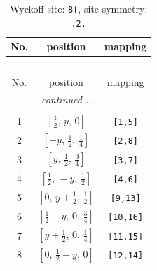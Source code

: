 \documentclass[fleqn,8pt]{jsarticle}
\begin{document}
\begin{longtable}{ccc}
\caption{Wyckoff site: {\tt 8f}, site symmetry: {\tt .2.}}
 \\
 \hline \hline
No. & position & mapping \\ \hline \endfirsthead

\multicolumn{2}{l}{\tablename\ \thetable{}} \\
 \hline \hline
No. & position & mapping \\ \hline \endhead

 \hline \hline
\multicolumn{2}{r}{\footnotesize\it continued ...} \\ \endfoot

 \hline \hline
\multicolumn{2}{r}{} \\ \endlastfoot

1 & $\left[ \frac{1}{2},\, y,\, 0 \right]$ & {\tt [1,5]} \\ \hline
2 & $\left[ - y,\, \frac{1}{2},\, \frac{1}{4} \right]$ & {\tt [2,8]} \\ \hline
3 & $\left[ y,\, \frac{1}{2},\, \frac{3}{4} \right]$ & {\tt [3,7]} \\ \hline
4 & $\left[ \frac{1}{2},\, - y,\, \frac{1}{2} \right]$ & {\tt [4,6]} \\ \hline
5 & $\left[ 0,\, y + \frac{1}{2},\, \frac{1}{2} \right]$ & {\tt [9,13]} \\ \hline
6 & $\left[ \frac{1}{2} - y,\, 0,\, \frac{3}{4} \right]$ & {\tt [10,16]} \\ \hline
7 & $\left[ y + \frac{1}{2},\, 0,\, \frac{1}{4} \right]$ & {\tt [11,15]} \\ \hline
8 & $\left[ 0,\, \frac{1}{2} - y,\, 0 \right]$ & {\tt [12,14]} \\
\end{longtable}
\renewcommand{\arraystretch}{1.2}
\end{document}
